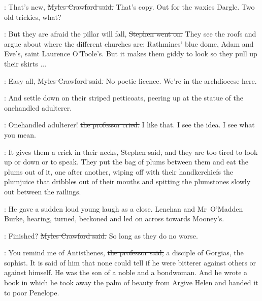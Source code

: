 
\crawford:
That's new,
\sout{Myles Crawford said.}
That's copy.
Out for the waxies Dargle.
Two old trickies, what?

\Stephen:
But they are afraid the pillar will fall,
\sout{Stephen went on.}
They see the roofs and argue about where the different churches are:
Rathmines' blue dome,
Adam and Eve's,
saint Laurence O'Toole's.
But it makes them giddy to look
so they pull up their skirts ...



\crawford:
Easy all,
\sout{Myles Crawford said.}
No poetic licence.
We're in the archdiocese here.

\Stephen:
And settle down on their striped petticoats,
peering up at the statue of the onehandled adulterer.

\machugh:
Onehandled adulterer!
\sout{the professor cried.}
I like that.
I see the idea.
I see what you mean.%



\Stephen:
It gives them a crick in their necks,
\sout{Stephen said,}
and they are too tired to look up or down or to speak.
They put the bag of plums between them and eat the plums out of it,
one after another,
wiping off with their handkerchiefs the plumjuice
that dribbles out of their mouths
and spitting the plumstones slowly out between the railings.

:
He gave a sudden loud young laugh as a close.
Lenehan and Mr~O'Madden Burke,
hearing,
turned,
beckoned
and led on across towards Mooney's.%

\crawford:
Finished?
\sout{Myles Crawford said.}
So long as they do no worse.



\machugh:
You remind me of Antisthenes,
\sout{the professor said,}
a disciple of Gorgias, the sophist.
It is said of him that none could tell
if he were bitterer against others or against himself.
He was the son of a noble and a bondwoman.
And he wrote a book
in which he took away the palm of beauty from Argive Helen
and handed it to poor Penelope.

